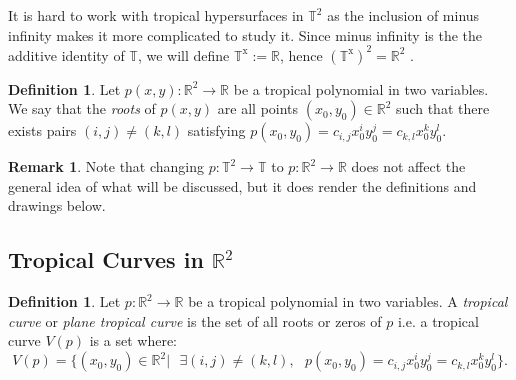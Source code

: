 \documentclass[]{article}
\theoremstyle{definition}
\numberwithin{equation}{section}
\newtheorem{defn}[thm]{Definition}
\newtheorem{rmk}[thm]{Remark}
\renewcommand{\.}{\,.}
\begin{document}
\hspace{3mm} It is hard to work with tropical hypersurfaces in $\mathbb{T}^2$ as the inclusion of minus infinity makes it more complicated to study it. Since minus infinity is the  the additive identity of $\mathbb{T}$, we will define $\mathbb{T}^\textrm{x}:=\mathbb{R}$, hence $(\mathbb{T}^\textrm{x})^2=\mathbb{R}^2$ .  
\begin{defn} Let $p(x,y):\mathbb{R}^2 \to \mathbb{R}$ be a tropical polynomial in two variables.  We say that the \emph{roots} of $p(x,y)$ are all points $(x_0,y_0) \in \mathbb{R}^2$ such that there exists pairs $(i,j)\neq(k,l)$ satisfying $p(x_0,y_0)=c_{i,j}x_0^iy_0^j=c_{k,l}x_0^k y_0^l$. \label{newroot}
\end{defn}
\begin{rmk} Note that changing $p:\mathbb{T}^2 \to \mathbb{T}$ to $p:\mathbb{R}^2 \to \mathbb{R}$ does not affect the general idea of what will be discussed, but it does render the definitions and drawings below.
\end{rmk}
\subsection{Tropical Curves in $\mathbb{R}^2$}
\begin{defn} Let $p:\mathbb{R}^2 \to \mathbb{R}$ be a tropical polynomial in two variables. A \emph{tropical curve} or \emph{plane tropical curve} is the set of all roots or zeros of $p$ i.e. a tropical curve $V(p)$ is a set where:
	\begin{equation}
		V(p)=\{(x_0,y_0)\in\mathbb{R}^2 |\textrm{ } \exists(i,j)\neq(k,l),\textrm{ } p(x_0,y_0)=c_{i,j}x_0^iy_0^j=c_{k,l}x_0^k y_0^l\}. \label{hehe}
	\end{equation}
\end{defn}
\end{document}
